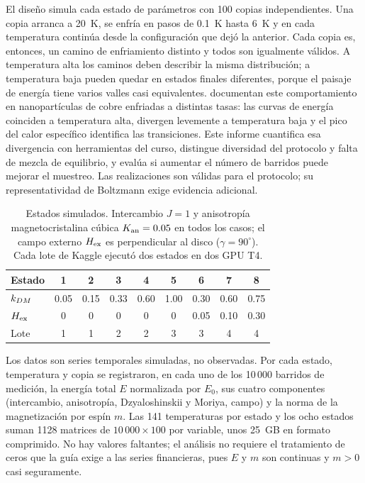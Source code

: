 El diseño simula cada estado de parámetros con 100 copias independientes. Una copia arranca a 20~K, se enfría en pasos de 0.1~K hasta 6~K y en cada temperatura continúa desde la configuración que dejó la anterior. Cada copia es, entonces, un camino de enfriamiento distinto y todos son igualmente válidos. A temperatura alta los caminos deben describir la misma distribución; a temperatura baja pueden quedar en estados finales diferentes, porque el paisaje de energía tiene varios valles casi equivalentes. \citet{rincon2026} documentan este comportamiento en nanopartículas de cobre enfriadas a distintas tasas: las curvas de energía coinciden a temperatura alta, divergen levemente a temperatura baja y el pico del calor específico identifica las transiciones. Este informe cuantifica esa divergencia con herramientas del curso, distingue diversidad del protocolo y falta de mezcla de equilibrio, y evalúa si aumentar el número de barridos puede mejorar el muestreo. Las realizaciones son válidas para el protocolo; su representatividad de Boltzmann exige evidencia adicional.

\begin{table}[H]
\centering\small
\caption{Estados simulados. Intercambio $J=1$ y anisotropía magnetocristalina cúbica $K_{\mathrm{an}}=0.05$ en todos los casos; el campo externo $H_{\mathrm{ex}}$ es perpendicular al disco ($\gamma=90^\circ$). Cada lote de Kaggle ejecutó dos estados en dos GPU T4.}
\label{tab:estados}
\begin{tabular}{lcccccccc}
\toprule
Estado & 1 & 2 & 3 & 4 & 5 & 6 & 7 & 8\\
\midrule
$k_{DM}$ & 0.05 & 0.15 & 0.33 & 0.60 & 1.00 & 0.30 & 0.60 & 0.75\\
$H_{\mathrm{ex}}$ & 0 & 0 & 0 & 0 & 0 & 0.05 & 0.10 & 0.30\\
Lote & 1 & 1 & 2 & 2 & 3 & 3 & 4 & 4\\
\bottomrule
\end{tabular}
\end{table}

Los datos son series temporales simuladas, no observadas. Por cada estado, temperatura y copia se registraron, en cada uno de los 10\,000 barridos de medición, la energía total $E$ normalizada por $E_0$, sus cuatro componentes (intercambio, anisotropía, Dzyaloshinskii y Moriya, campo) y la norma de la magnetización por espín $m$. Las 141 temperaturas por estado y los ocho estados suman 1128 matrices de $10\,000\times100$ por variable, unos 25~GB en formato comprimido. No hay valores faltantes; el análisis no requiere el tratamiento de ceros que la guía exige a las series financieras, pues $E$ y $m$ son continuas y $m>0$ casi seguramente.

